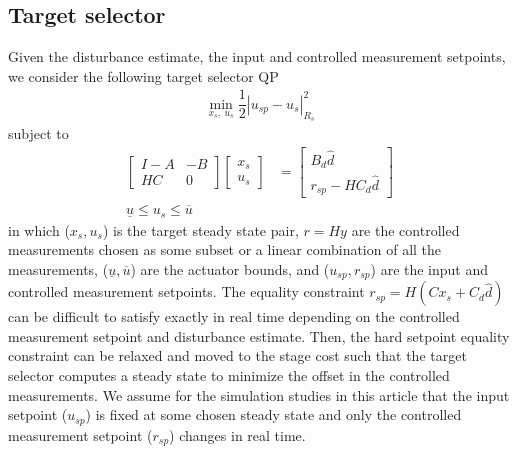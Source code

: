 \documentclass[preprint,5p, twocolumn, authoryear]{elsarticle}
\begin{document}
\subsection{Target selector}
Given the disturbance estimate, the
input and controlled measurement setpoints,
we consider the following target selector QP
\begin{align}
    \min_{x_s, \ u_s}  \dfrac{1}{2} |u_{sp} - u_s|^2_{R_s}
\end{align}
subject to
\begin{align}  
    \begin{bmatrix}
        I -A & -B \\
        HC & 0
    \end{bmatrix} \begin{bmatrix}
        x_s \\
        u_s
    \end{bmatrix} &= \begin{bmatrix}
        B_d\hat{d} \\
        r_{sp} - HC_d\hat{d}
    \end{bmatrix} \\
    \underline{u} \leq u_s \leq \overline{u}
\end{align}
in which
($x_s, u_s$) is the 
target steady state pair,
$r=Hy$ are the controlled measurements
chosen as some subset 
or a linear combination of all the measurements,
($\underline{u}, \overline{u}$) are the 
actuator bounds, and
($u_{sp}, r_{sp}$) are the input and 
controlled measurement setpoints.
The equality constraint $r_{sp} = H(Cx_s + C_d\hat{d})$
can be difficult to satisfy exactly in real time 
depending on the controlled measurement setpoint 
and disturbance estimate. 
Then, the hard setpoint equality constraint 
can be relaxed and moved to the stage cost such 
that the target selector computes a steady state
to minimize the offset in the controlled measurements. 
We assume for the simulation studies
in this article that the input setpoint ($u_{sp}$)
is fixed at some chosen steady state and 
only the controlled measurement setpoint ($r_{sp}$) 
changes in real time.
\end{document}
